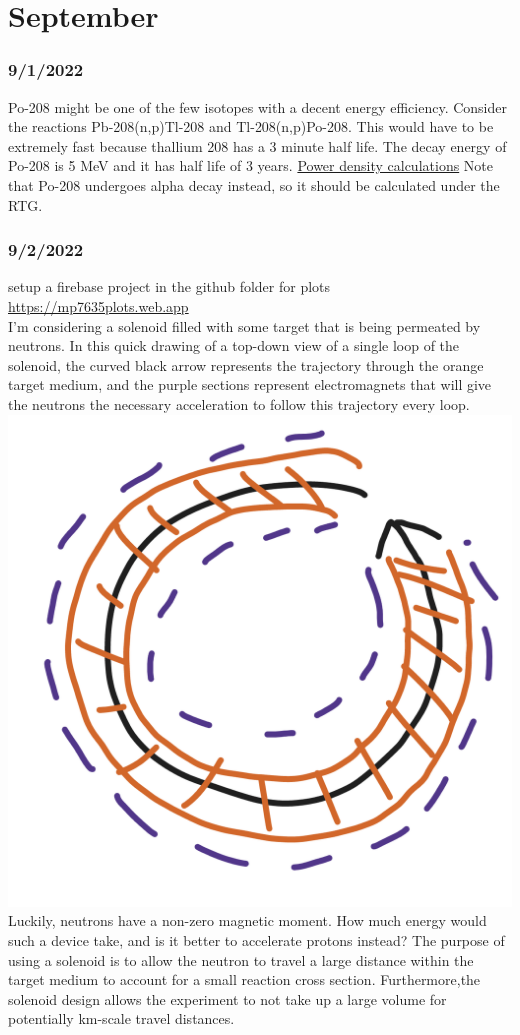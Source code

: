 \documentclass[12pt]{article}
\begin{document}
\section{September}
\subsubsection{9/1/2022}
Po-208 might be one of the few isotopes with a decent energy efficiency. Consider the reactions 
Pb-208(n,p)Tl-208 and Tl-208(n,p)Po-208. This would have to be extremely fast because thallium 208 has a 3 minute half life. The decay energy of Po-208 is 5 MeV and it has half life of 3 years. \href{https://github.com/MarcosP7635/Energy/blob/main/Power_density_po_208.ipynb}{Power density calculations} Note that Po-208 undergoes alpha decay instead, so it should be calculated under the RTG.
\subsubsection{9/2/2022}
setup a firebase project in the github folder for plots \href{https://mp7635plots.web.app}{https://mp7635plots.web.app}\\
I'm considering a solenoid filled with some target that is being permeated by neutrons. In this quick drawing of a top-down view of a single loop of the solenoid, the curved black arrow represents the trajectory through the
orange target medium, and the purple sections represent electromagnets that will give the neutrons the necessary acceleration to follow this trajectory every loop. \\
\includegraphics[]{Images/single_loop_top_down.PNG}\\
Luckily, neutrons have a non-zero magnetic moment. How much energy would such a device take, and is it better to accelerate protons instead? The purpose of using a solenoid is to allow the neutron to travel a large distance within the target medium to account for a small reaction cross section. Furthermore,the solenoid design allows the experiment to not take up a large volume for potentially km-scale travel distances. 
\end{document}
